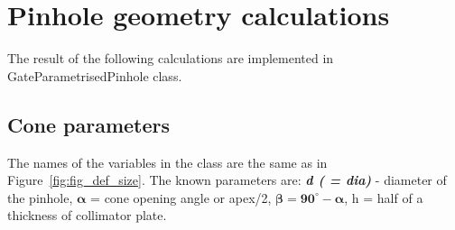 \documentclass[12pt]{article}
\begin{document}
\clearpage
\section{Pinhole geometry calculations}
The result of the following calculations are implemented in GateParametrisedPinhole class.

\subsection{Cone parameters}
The names of the variables in the class are the same as in Figure~\ref{fig:fig_def_size}.
The known parameters are: \textbf{\textit{d ( = dia)}} - diameter of the pinhole, $\mathbf{\alpha}$ = cone opening angle or apex/2, $\mathbf{\beta = 90^{\circ} - \alpha}$, h = half of a thickness of collimator plate.
\end{document}
